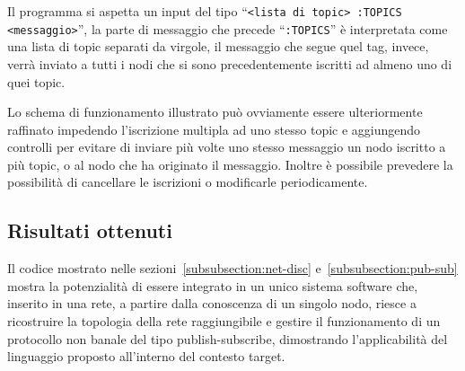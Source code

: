 \documentclass[]{article}
\begin{document}
Il programma si aspetta un input del tipo ``\texttt{<lista di topic> :TOPICS <messaggio>}'', la parte di messaggio che precede ``\texttt{:TOPICS}'' è interpretata come una lista di topic separati da virgole, il messaggio che segue quel tag, invece, verrà inviato a tutti i nodi che si sono precedentemente iscritti ad almeno uno di quei topic.



Lo schema di funzionamento illustrato può ovviamente essere ulteriormente raffinato impedendo l'iscrizione multipla ad uno stesso topic e aggiungendo controlli per evitare di inviare più volte uno stesso messaggio un nodo iscritto a più topic, o al nodo che ha originato il messaggio. Inoltre è possibile prevedere la possibilità di cancellare le iscrizioni o modificarle periodicamente.

\subsection{Risultati ottenuti}\label{subsection:risultati}

Il codice mostrato nelle sezioni~\ref{subsubsection:net-disc} e~\ref{subsubsection:pub-sub} mostra la potenzialità di essere integrato in un unico sistema software che, inserito in una rete, a partire dalla conoscenza di un singolo nodo, riesce a ricostruire la topologia della rete raggiungibile e gestire il funzionamento di un protocollo non banale del tipo publish-subscribe, dimostrando l'applicabilità del linguaggio proposto all'interno del contesto target. 
\end{document}
